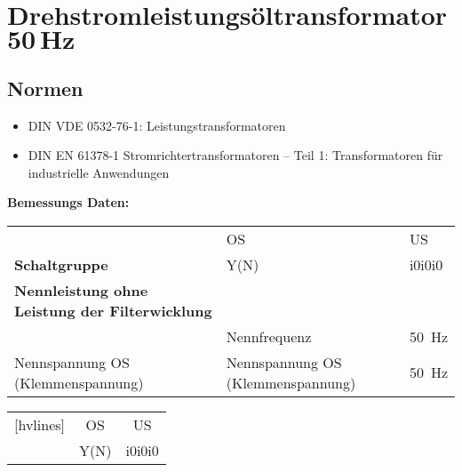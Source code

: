 \section{Drehstromleistungsöltransformator $\mathbf{50\, Hz}$}
\subsection{Normen}
\begin{itemize}
    \item DIN VDE 0532-76-1: Leistungstransformatoren
    \item DIN EN 61378-1 Stromrichtertransformatoren –
    Teil 1: Transformatoren für industrielle Anwendungen
\end{itemize}

\textbf{Bemessungs Daten:}

\begin{table}[htb]
    \centering
    \begin{tabular}{|p{10cm}|p{2cm}|p{2cm}|}
        \hline
        \cellcolor{lightergray} & \cellcolor{white} OS & \cellcolor{white} US \\
         \multirow{-2}{10cm}{\cellcolor{lightgray}\textbf{Schaltgruppe}} & Y(N) &   i0i0i0  \\
        \hline
        \cellcolor{lightergray} \textbf{Nennleistung ohne Leistung der Filterwicklung}  &  & \\
        \hline
        \cellcolor{lightergray}   & Nennfrequenz &   \SI{50}{\Hz}  \\
        \hline
        \cellcolor{lightergray} Nennspannung OS (Klemmenspannung)  & Nennspannung OS (Klemmenspannung) &   \SI{50}{\Hz}  \\
    \end{tabular}
\end{table}
\begin{table}
    \begin{NiceTabular}{lcc}[hvlines]
        
         & OS & US \\ 
                                & Y(N) &   i0i0i0  \\
    \end{NiceTabular}
\end{table}

    
